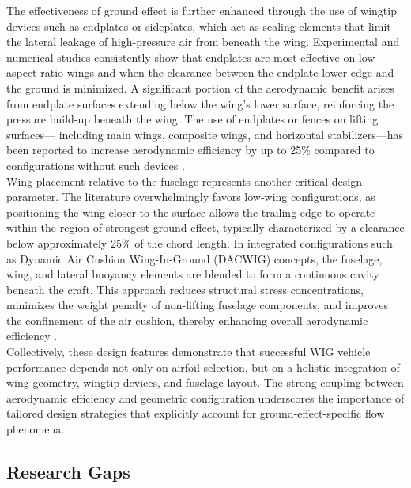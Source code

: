 \noindent The effectiveness of ground effect is further enhanced through the use of wingtip devices such
as endplates or sideplates, which act as sealing elements that limit the lateral leakage of
high-pressure air from beneath the wing. Experimental and numerical studies consistently show
that endplates are most effective on low-aspect-ratio wings and when the clearance between the
endplate lower edge and the ground is minimized. A significant portion of the aerodynamic
benefit arises from endplate surfaces extending below the wing's lower surface, reinforcing
the pressure build-up beneath the wing. The use of endplates or fences on lifting surfaces—
including main wings, composite wings, and horizontal stabilizers—has been reported to
increase aerodynamic efficiency by up to 25\% compared to configurations without such devices \cite{ISU_thesis}\cite{Rozhdestvensky_WIG-book}\cite{SPRINGER_WIG-book}.\\

\noindent Wing placement relative to the fuselage represents another critical design parameter. The
literature overwhelmingly favors low-wing configurations, as positioning the wing closer to
the surface allows the trailing edge to operate within the region of strongest ground effect,
typically characterized by a clearance below approximately 25\% of the chord length. In
integrated configurations such as Dynamic Air Cushion Wing-In-Ground (DACWIG) concepts, the
fuselage, wing, and lateral buoyancy elements are blended to form a continuous cavity beneath
the craft. This approach reduces structural stress concentrations, minimizes the weight
penalty of non-lifting fuselage components, and improves the confinement of the air cushion,
thereby enhancing overall aerodynamic efficiency \cite{Rozhdestvensky_WIG-book}\cite{SPRINGER_WIG-book}\cite{IFAC_controlled_WIG_flight_concept}.\\

\noindent Collectively, these design features demonstrate that successful WIG vehicle performance
depends not only on airfoil selection, but on a holistic integration of wing geometry, wingtip
devices, and fuselage layout. The strong coupling between aerodynamic efficiency and geometric
configuration underscores the importance of tailored design strategies that explicitly
account for ground-effect-specific flow phenomena.

\subsection{Research Gaps}

